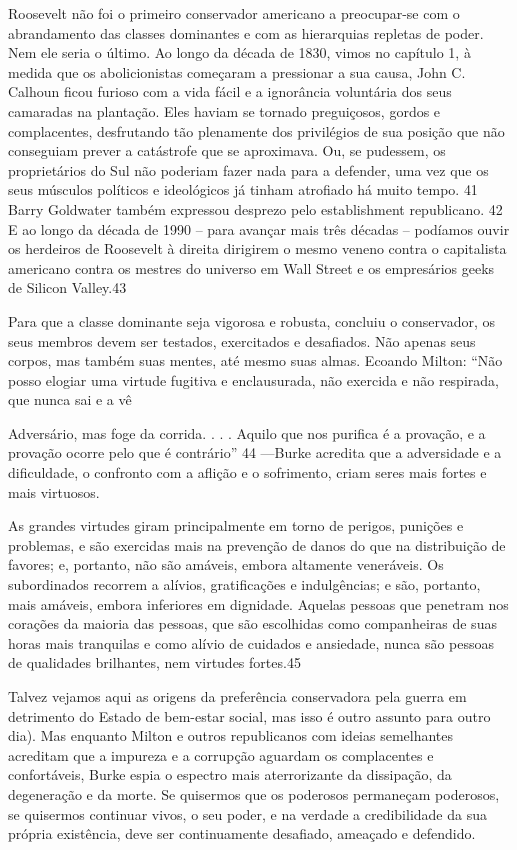  \par 
Roosevelt não foi o primeiro conservador americano a preocupar-se com o abrandamento das classes dominantes e com as hierarquias repletas de poder. Nem ele seria o último. Ao longo da década de 1830, vimos no capítulo 1, à medida que os abolicionistas começaram a pressionar a sua causa, John C. Calhoun ficou furioso com a vida fácil e a ignorância voluntária dos seus camaradas na plantação. Eles haviam se tornado preguiçosos, gordos e complacentes, desfrutando tão plenamente dos privilégios de sua posição que não conseguiam prever a catástrofe que se aproximava. Ou, se pudessem, os proprietários do Sul não poderiam fazer nada para a defender, uma vez que os seus músculos políticos e ideológicos já tinham atrofiado há muito tempo. {\color{blue}41} Barry Goldwater também expressou desprezo pelo establishment republicano. {\color{blue}42} E ao longo da década de 1990 – para avançar mais três décadas – podíamos ouvir os herdeiros de Roosevelt à direita dirigirem o mesmo veneno contra o capitalista americano contra os mestres do universo em Wall Street e os empresários geeks de Silicon Valley.{\color{blue}43}
 \par 
Para que a classe dominante seja vigorosa e robusta, concluiu o conservador, os seus membros devem ser testados, exercitados e desafiados. Não apenas seus corpos, mas também suas mentes, até mesmo suas almas. Ecoando Milton: “Não posso elogiar uma virtude fugitiva e enclausurada, não exercida e não respirada, que nunca sai e a vê
 \par 
Adversário, mas foge da corrida. . . . Aquilo que nos purifica é a provação, e a provação ocorre pelo que é contrário” {\color{blue}44} —Burke acredita que a adversidade e a dificuldade, o confronto com a aflição e o sofrimento, criam seres mais fortes e mais virtuosos.
 \par 
As grandes virtudes giram principalmente em torno de perigos, punições e problemas, e são exercidas mais na prevenção de danos do que na distribuição de favores; e, portanto, não são amáveis, embora altamente veneráveis. Os subordinados recorrem a alívios, gratificações e indulgências; e são, portanto, mais amáveis, embora inferiores em dignidade. Aquelas pessoas que penetram nos corações da maioria das pessoas, que são escolhidas como companheiras de suas horas mais tranquilas e como alívio de cuidados e ansiedade, nunca são pessoas de qualidades brilhantes, nem virtudes fortes.{\color{blue}45}
 \par 
Talvez vejamos aqui as origens da preferência conservadora pela guerra em detrimento do Estado de bem-estar social, mas isso é outro assunto para outro dia). Mas enquanto Milton e outros republicanos com ideias semelhantes acreditam que a impureza e a corrupção aguardam os complacentes e confortáveis, Burke espia o espectro mais aterrorizante da dissipação, da degeneração e da morte. Se quisermos que os poderosos permaneçam poderosos, se quisermos continuar vivos, o seu poder, e na verdade a credibilidade da sua própria existência, deve ser continuamente desafiado, ameaçado e defendido.
